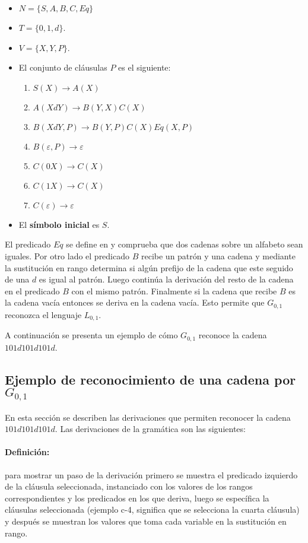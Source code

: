 \begin{itemize}
    \item $N=\{S,A,B,C,Eq\}$
    \item $T=\{0,1,d\}$.
    \item $V=\{X,Y,P\}$.
    \item El conjunto de cláusulas $P$ es el siguiente:
          \begin{enumerate}
              \item $S(X)\to A(X)$
              \item $A(XdY)\to B(Y,X)C(X)$
              \item $B(XdY,P)\to B(Y,P) C(X) Eq(X,P)$
              \item $B(\varepsilon,P)\to \varepsilon$
              \item $C(0X)\to C(X)$
              \item $C(1X)\to C(X)$
              \item $C(\varepsilon)\to \varepsilon$
          \end{enumerate}
    \item El \textbf{símbolo inicial} es $S$.
\end{itemize}

El predicado $Eq$ se define en \cite{mainRCGBib} y comprueba que dos cadenas sobre un alfabeto sean iguales.
Por otro lado el predicado $B$ recibe un patrón y una cadena y mediante la sustitución en rango determina
si algún prefijo de la cadena que este seguido de una $d$ es igual al patrón. Luego continúa la derivación
del resto de la cadena en el predicado $B$ con el mismo patrón. Finalmente si la cadena que recibe $B$ es la cadena
vacía entonces se deriva en la cadena vacía. Esto permite que $G_{0,1}$ reconozca el lenguaje $L_{0,1}$.

A continuación se presenta un ejemplo de cómo $G_{0,1}$ reconoce la cadena $101d101d101d$.

\subsection{Ejemplo de reconocimiento de una cadena por $G_{0,1}$}

En esta sección se describen las derivaciones que permiten reconocer la cadena $101d101d101d$. Las derivaciones
de la gramática son las siguientes:

\paragraph{Definición:} para mostrar un paso de la derivación primero se muestra el predicado izquierdo de la cláusula
seleccionada, instanciado con los valores de los rangos correspondientes y los predicados en los que deriva, luego se específica la cláusulas seleccionada
(ejemplo c-4, significa que se selecciona la cuarta cláusula) y después se muestran los valores que toma cada variable
en la sustitución en rango.

